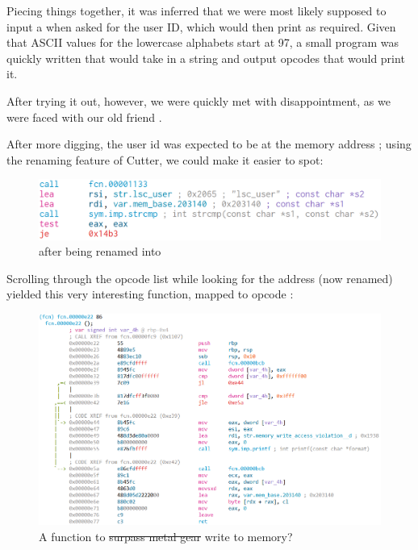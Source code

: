 		Piecing things together, it was inferred that we were most likely supposed to input a  when asked for the user ID,
		which would then print  as required. Given that ASCII values for the lowercase alphabets start at 97, a small
		program was quickly written that would take in a string and output opcodes that would print it.

		After trying it out, however, we were quickly met with disappointment, as we were faced with our old friend .

		\pagebreak
		After more digging, the user id was expected to be at the memory address ; using the renaming feature of Cutter, we could
		make it easier to spot:

		\begin{figure}[!htbp]\centering
			\includegraphics[width=150mm]{figures/lscvm-ii/addr-after-rename.png} \vspace{5mm}
			\caption{\ttt{[0x203140]} after being renamed into }
		\end{figure}

		Scrolling through the opcode list while looking for the address (now renamed) yielded this very interesting function, mapped to opcode
		:

		\begin{figure}[!htbp]\centering
			\includegraphics[width=150mm]{figures/lscvm-ii/write-to-memory.png} \vspace{5mm}
			\caption{A function to \sout{surpass metal gear} write to memory?}
		\end{figure}

